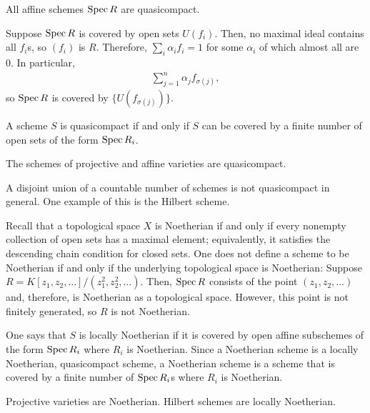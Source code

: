 \documentclass [11 pt, oneside] {article}
\begin{document}
\begin{remark}
	All affine schemes $\operatorname{Spec} R$ are quasicompact.
\end{remark}

Suppose $\operatorname{Spec} R$ is covered by open sets $U({f_i})$. Then, no maximal ideal contains all $f_i$s, so $(f_i)$ is $R$. Therefore, $\sum_{i}^{} \alpha_if_i=1$ for some $\alpha_i$ of which almost all are $0$. In particular,
\begin{align*}
	\sum_{j=1}^{n} \alpha_{j}f_{\sigma(j) },
\end{align*}
so $\operatorname{Spec} R$ is covered by $\{U({f_{\sigma(j)}})\}$.

\begin{remark}
	A scheme $S$ is quasicompact if and only if $S$ can be covered by a finite number of open sets of the form $\operatorname{Spec} R_i$.
\end{remark}

\begin{example}[ ]\label{}\text{}
The schemes of projective and affine varieties are quasicompact. 
\end{example}

\begin{example}[ ]\label{}\text{}
A disjoint union of a countable number of schemes is not quasicompact in general. One example of this is the Hilbert scheme.
\end{example}

Recall that a topological space $X$ is Noetherian if and only if every nonempty collection of open sets has a maximal element; equivalently, it satisfies the descending chain condition for closed sets. 
One does not define a scheme to be Noetherian if and only if the underlying topological space is Noetherian: Suppose $R = K[z_1,z_2,\hdots]/(z_1^2,z_2^2,\hdots)$. Then, $\operatorname{Spec} R$ consists of the point $(z_1,z_2,\hdots)$ and, therefore, is Noetherian as a topological space. However, this point is not finitely generated, so $R$ is not Noetherian.

One says that $S$ is locally Noetherian if it is covered by open affine subschemes of the form $\operatorname{Spec} R_i$ where $R_i$ is Noetherian. Since a Noetherian scheme is a locally Noetherian, quasicompact scheme, a Noetherian scheme is a scheme that is covered by a finite number of $\operatorname{Spec} R_i$s where $R_i$ is Noetherian.

\begin{example}[ ]\label{}\text{}
Projective varieties are Noetherian. Hilbert schemes are locally Noetherian.
\end{example}
\end{document}
